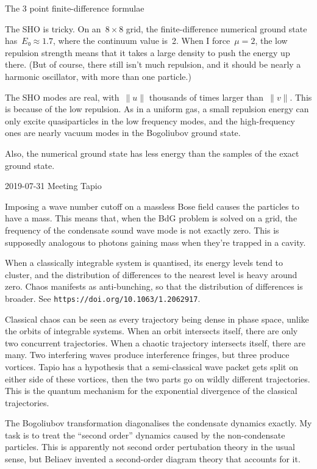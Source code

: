 The 3 point finite-difference formulae 

The SHO is tricky.  On an~$8×8$ grid, the finite-difference numerical ground state has~$E₀≈1.7$, where the continuum value is~2.  When I force~$μ=2$, the low repulsion strength means that it takes a large density to push the energy up there.  (But of course, there still isn't much repulsion, and it should be nearly a harmonic oscillator, with more than one particle.)

The SHO modes are real, with~$∥u∥$ thousands of times larger than~$∥v∥$.  This is because of the low repulsion.  As in a uniform gas, a small repulsion energy can only excite quasiparticles in the low frequency modes, and the high-frequency ones are nearly vacuum modes in the Bogoliubov ground state. 

Also, the numerical ground state has less energy than the samples of the exact ground state.

2019-07-31 Meeting Tapio

Imposing a wave number cutoff on a massless Bose field causes the particles to have a mass.  This means that, when the BdG problem is solved on a grid, the frequency of the condensate sound wave mode is not exactly zero.  This is supposedly analogous to photons gaining mass when they're trapped in a cavity.

When a classically integrable system is quantised, its energy levels tend to cluster, and the distribution of differences to the nearest level is heavy around zero.  Chaos manifests as anti-bunching, so that the distribution of differences is broader.  See {\tt https://doi.org/10.1063/1.2062917}.

Classical chaos can be seen as every trajectory being dense in phase space, unlike the orbits of integrable systems.  When an orbit intersects itself, there are only two concurrent trajectories.  When a chaotic trajectory intersects itself, there are many.  Two interfering waves produce interference fringes, but three produce vortices.  Tapio has a hypothesis that a semi-classical wave packet gets split on either side of these vortices, then the two parts go on wildly different trajectories.  This is the quantum mechanism for the exponential divergence of the classical trajectories.

The Bogoliubov transformation diagonalises the condensate dynamics exactly.  My task is to treat the “second order” dynamics caused by the non-condensate particles.  This is apparently not second order pertubation theory in the usual sense, but Beliaev invented a second-order diagram theory that accounts for it.


